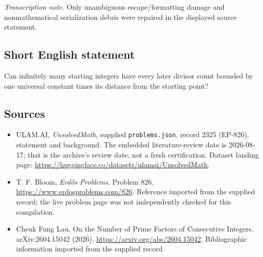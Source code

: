 \documentclass[11pt,a4paper]{article}
\begin{document}
{\small\emph{Transcription note.} Only unambiguous escape/formatting damage and nonmathematical serialization debris were repaired in the displayed source statement.}

\subsection{Short English statement}

Can infinitely many starting integers have every later divisor count bounded by one universal constant times its distance from the starting point?

\subsection{Sources}

{\small

\begin{itemize}

\item[\hypertarget{source:2325:1}{S1}] ULAM.AI, \emph{UnsolvedMath}, supplied \texttt{problems.json}, record 2325 (EP-826), statement and background. The embedded literature-review date is 2026-08-17; that is the archive’s review date, not a fresh certification. Dataset landing page: \url{https://huggingface.co/datasets/ulamai/UnsolvedMath}.

\item[\hypertarget{source:2325:2}{S2}] T. F. Bloom, \emph{Erdős Problems}, Problem 826, \url{https://www.erdosproblems.com/826}. Reference imported from the supplied record; the live problem page was not independently checked for this compilation.

\item[\hypertarget{source:2325:3}{S3}] Cheuk Fung Lau, On the Number of Prime Factors of Consecutive Integers, arXiv:2604.15042 (2026). \url{https://arxiv.org/abs/2604.15042}. Bibliographic information imported from the supplied record.

\end{itemize}

}

\label{end:2325}
\end{document}
